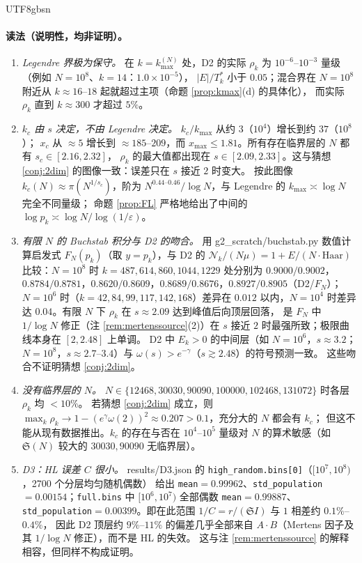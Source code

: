 \documentclass[11pt,a4paper]{article}
\newcommand{\Haar}{\mu}
\newcommand{\Sing}{\mathfrak S}
\newcommand{\Cnt}{\mathcal N}          %
\newcommand{\Tmix}{T^{*}}               %
\newcommand{\kmax}{k_{\max}}
\theoremstyle{plain}
\theoremstyle{definition}
\begin{document}
\begin{CJK}{UTF8}{gbsn}
\paragraph{读法（说明性，均非证明）。}
\begin{enumerate}[leftmargin=*]
\item \emph{Legendre 界极为保守。} 在 $k=\kmax^{(N)}$ 处，D2 的实际 $\rho_k$ 为 $10^{-6}$--$10^{-3}$ 量级（例如 $N=10^8$、$k=14$：$1.0\times10^{-5}$），
$|E|/\Tmix_k$ 小于 $0.05$；混合界在 $N=10^8$ 附近从 $k\approx16$--$18$ 起就超过主项（命题 \ref{prop:kmax}(d) 的具体化），
而实际 $\rho_k$ 直到 $k\approx300$ 才超过 $5\%$。
\item \emph{$k_c$ 由 $s$ 决定，不由 Legendre 决定。} $k_c/\kmax$ 从约 $3$（$10^4$）增长到约 $37$（$10^8$）；
$x_c$ 从 $\approx5$ 增长到 $\approx185$--$209$，而 $x_{\max}\le1.81$。所有存在临界层的 $N$ 都有 $s_c\in[2.16,2.32]$，
$\rho_k$ 的最大值都出现在 $s\in[2.09,2.33]$。这与猜想 \ref{conj:2dim} 的图像一致：误差只在 $s$ 接近 $2$ 时变大。
按此图像 $k_c(N)\approx\pi(N^{1/s_c})$，阶为 $N^{0.44\text{--}0.46}/\log N$，与 Legendre 的 $\kmax\asymp\log N$ 完全不同量级；
命题 \ref{prop:FL} 严格地给出了中间的 $\log p_k\asymp\log N/\log(1/\varepsilon)$。
\item \emph{有限 $N$ 的 Buchstab 积分与 D2 的吻合。} 用 g2\_scratch/buchstab.py 数值计算启发式 $F_N(p_k)$（取 $y=p_k$），与 D2 的
$\Cnt_k/(N\Haar)=1+E/(N\cdot\mathrm{Haar})$ 比较：$N=10^8$ 时 $k=487,614,860,1044,1229$ 处分别为
$0.9000/0.9002$，$0.8784/0.8781$，$0.8620/0.8609$，$0.8689/0.8676$，$0.8927/0.8905$（D2/$F_N$）；
$N=10^6$ 时（$k=42,84,99,117,142,168$）差异在 $0.012$ 以内，$N=10^4$ 时差异达 $0.04$。有限 $N$ 下 $\rho_k$ 在 $s\approx2.09$ 达到峰值后向顶层回落，
是 $F_N$ 中 $1/\log N$ 修正（注 \ref{rem:mertenssource}(2)）在 $s$ 接近 $2$ 时最强所致；极限曲线本身在 $[2,2.48]$ 上单调。
D2 中 $E_k>0$ 的中间层（如 $N=10^6$，$s\approx3.2$；$N=10^8$，$s\approx2.7$--$3.4$）与 $\omega(s)>e^{-\gamma}$（$s\gtrsim2.48$）的符号预测一致。
这些吻合不证明猜想 \ref{conj:2dim}。
\item \emph{没有临界层的 $N$。} $N\in\{12468,30030,90090,100000,102468,131072\}$ 时各层 $\rho_k$ 均 $<10\%$。
若猜想 \ref{conj:2dim} 成立，则 $\max_k\rho_k\to1-(e^\gamma\omega(2))^2\approx0.207>0.1$，充分大的 $N$ 都会有 $k_c$；
但这不能从现有数据推出。$k_c$ 的存在与否在 $10^4$--$10^5$ 量级对 $N$ 的算术敏感（如 $\Sing(N)$ 较大的 $30030,90090$ 无临界层）。
\item \emph{D3：HL 误差 $C$ 很小。} results/D3.json 的 \texttt{high\_random.bins[0]}（$[10^7,10^8)$，2700 个分层均匀随机偶数）
给出 \texttt{mean}$=0.99962$、\texttt{std\_population}$=0.00154$；\texttt{full.bins} 中 $[10^6,10^7)$ 全部偶数 \texttt{mean}$=0.99887$、
\texttt{std\_population}$=0.00399$。即在此范围 $1/C=r/(\Sing I)$ 与 $1$ 相差约 $0.1\%$--$0.4\%$，
因此 D2 顶层约 $9\%$--$11\%$ 的偏差几乎全部来自 $A\cdot B$（Mertens 因子及其 $1/\log N$ 修正），而不是 HL 的失效。
这与注 \ref{rem:mertenssource} 的解释相容，但同样不构成证明。
\end{enumerate}


\end{CJK}
\end{document}
